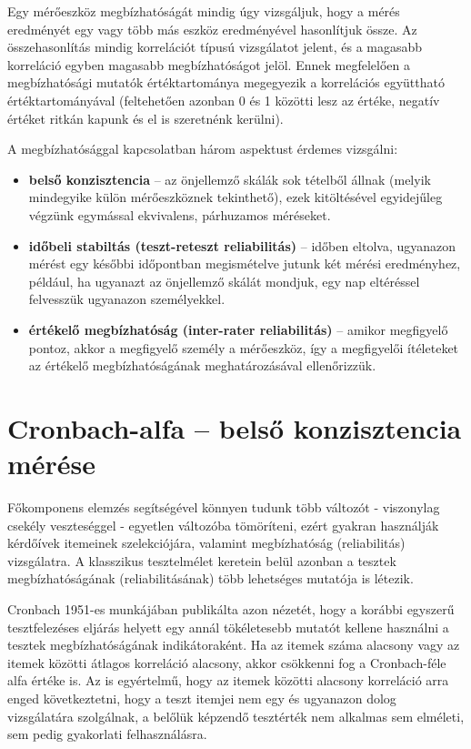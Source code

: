 \documentclass[
  letterpaper,
]{krantz}
\providecommand{\tightlist}{%
  \setlength{\itemsep}{0pt}\setlength{\parskip}{0pt}}\usepackage{longtable,booktabs,array}
\begin{document}
Egy mérőeszköz megbízhatóságát mindig úgy vizsgáljuk, hogy a mérés
eredményét egy vagy több más eszköz eredményével hasonlítjuk össze. Az
összehasonlítás mindig korrelációt típusú vizsgálatot jelent, és a
magasabb korreláció egyben magasabb megbízhatóságot jelöl. Ennek
megfelelően a megbízhatósági mutatók értéktartománya megegyezik a
korrelációs együttható értéktartományával (feltehetően azonban 0 és 1
közötti lesz az értéke, negatív értéket ritkán kapunk és el is
szeretnénk kerülni).

A megbízhatósággal kapcsolatban három aspektust érdemes vizsgálni:

\begin{itemize}
\tightlist
\item
  \textbf{belső konzisztencia} -- az önjellemző skálák sok tételből
  állnak (melyik mindegyike külön mérőeszköznek tekinthető), ezek
  kitöltésével egyidejűleg végzünk egymással ekvivalens, párhuzamos
  méréseket.
\item
  \textbf{időbeli stabiltás (teszt-reteszt reliabilitás)} -- időben
  eltolva, ugyanazon mérést egy későbbi időpontban megismételve jutunk
  két mérési eredményhez, például, ha ugyanazt az önjellemző skálát
  mondjuk, egy nap eltéréssel felvesszük ugyanazon személyekkel.
\item
  \textbf{értékelő megbízhatóság (inter-rater reliabilitás)} -- amikor
  megfigyelő pontoz, akkor a megfigyelő személy a mérőeszköz, így a
  megfigyelői ítéleteket az értékelő megbízhatóságának meghatározásával
  ellenőrizzük.
\end{itemize}

\hypertarget{cronbach-alfa-belsux151-konzisztencia-muxe9ruxe9se}{%
\section{Cronbach-alfa -- belső konzisztencia
mérése}\label{cronbach-alfa-belsux151-konzisztencia-muxe9ruxe9se}}

Főkomponens elemzés segítségével könnyen tudunk több változót -
viszonylag csekély veszteséggel - egyetlen változóba tömöríteni, ezért
gyakran használják kérdőívek itemeinek szelekciójára, valamint
megbízhatóság (reliabilitás) vizsgálatra. A klasszikus tesztelmélet
keretein belül azonban a tesztek megbízhatóságának (reliabilitásának)
több lehetséges mutatója is létezik.

Cronbach 1951-es munkájában publikálta azon nézetét, hogy a korábbi
egyszerű tesztfelezéses eljárás helyett egy annál tökéletesebb mutatót
kellene használni a tesztek megbízhatóságának indikátoraként. Ha az
itemek száma alacsony vagy az itemek közötti átlagos korreláció
alacsony, akkor csökkenni fog a Cronbach-féle alfa értéke is. Az is
egyértelmű, hogy az itemek közötti alacsony korreláció arra enged
következtetni, hogy a teszt itemjei nem egy és ugyanazon dolog
vizsgálatára szolgálnak, a belőlük képzendő tesztérték nem alkalmas sem
elméleti, sem pedig gyakorlati felhasználásra.
\end{document}
